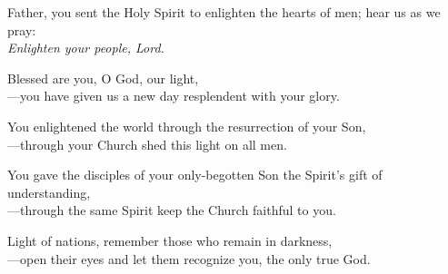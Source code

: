 \intercessions

\begin{raggedright}
Father, you sent the Holy Spirit to enlighten the hearts of men; hear us as we pray:\\
\emph{Enlighten your people, Lord.}

\medskip
Blessed are you, O God, our light,\\
{\color{red}---}you have given us a new day resplendent with your glory.

\medskip
You enlightened the world through the resurrection of your Son,\\
{\color{red}---}through your Church shed this light on all men.

\medskip
You gave the disciples of your only-begotten Son the Spirit’s gift of understanding,\\
{\color{red}---}through the same Spirit keep the Church faithful to you.

\medskip
Light of nations, remember those who remain in darkness,\\
{\color{red}---}open their eyes and let them recognize you, the only true God.
\end{raggedright}